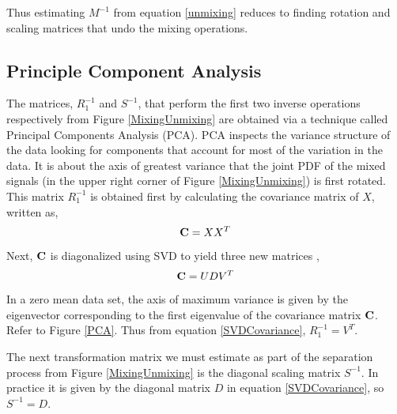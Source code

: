 Thus estimating $M^{-1}$ from equation \ref{unmixing} reduces to
finding rotation and scaling matrices that undo the mixing operations.

\vspace{5mm}
\subsection{Principle Component Analysis}

The matrices, $R_{1}^{-1}$ and $S^{-1}$, that perform the
first two inverse operations respectively from Figure
\ref{MixingUnmixing} are obtained via a technique called Principal 
Components Analysis (PCA). PCA inspects the variance structure of 
the data looking for components that account for most of the variation
in the data. It is about the axis of greatest variance that the joint
PDF of the mixed signals (in the upper right corner of Figure \ref{MixingUnmixing}) is
first rotated. This matrix $R_{1}^{-1}$ is obtained first by
calculating the covariance matrix of $X$, written as,
\begin{equation}
  \label{covariance}
  {\bf C}  = XX^{T}
\end{equation}
Next, ${\bf C}$ is diagonalized using SVD to yield three new matrices \cite{Strang:93},
\begin{equation}
{\bf C} = UDV^{T}
\label{SVDCovariance}
\end{equation}
In a zero mean data set, the axis of maximum variance is given by the 
eigenvector corresponding to the first eigenvalue of the covariance matrix ${\bf
C}$. Refer to Figure \ref{PCA}. Thus from equation \ref{SVDCovariance}, $R_{1}^{-1} = V^{T}$. 

The next transformation matrix we must estimate as part of the
separation process from Figure \ref{MixingUnmixing} is the diagonal
scaling matrix $S^{-1}$. In practice it is given by the diagonal
matrix $D$ in equation \ref{SVDCovariance}, so $S^{-1} = D$. 


